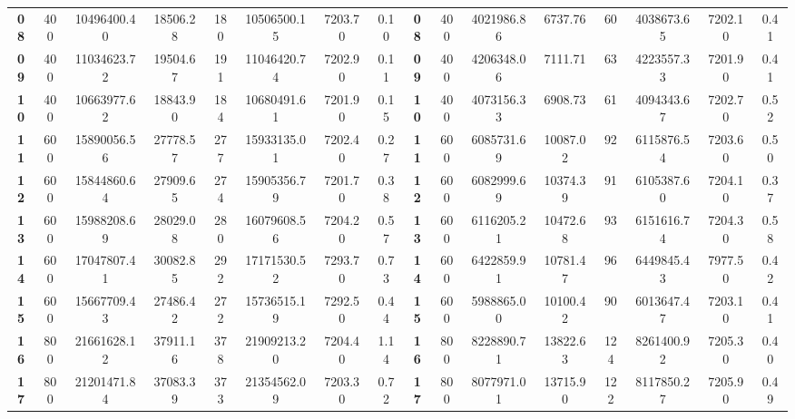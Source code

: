 \begin{table}[htbp]
{\begin{tabular}{cccccccccccccccc}
    \textbf{08}  & 400  & 10496400.40        & 18506.28  & 180               & 10506500.15       & 7203.70 & 0.10 & \textbf{08}  & 400  & 4021986.86         & 6737.76  & 60               & 4038673.65       & 7202.10 & 0.41  \\
    \textbf{09}  & 400  & 11034623.72        & 19504.67  & 191               & 11046420.74       & 7202.90 & 0.11 & \textbf{09}  & 400  & 4206348.06         & 7111.71  & 63               & 4223557.33       & 7201.90 & 0.41  \\
    \textbf{10}  & 400  & 10663977.62        & 18843.90  & 184               & 10680491.61       & 7201.90 & 0.15 & \textbf{10}  & 400  & 4073156.33         & 6908.73  & 61               & 4094343.67       & 7202.70 & 0.52  \\
    \textbf{11}  & 600  & 15890056.56        & 27778.57  & 277               & 15933135.01       & 7202.40 & 0.27 & \textbf{11}  & 600  & 6085731.69         & 10087.02  & 92               & 6115876.54       & 7203.60 & 0.50  \\
    \textbf{12}  & 600  & 15844860.64        & 27909.65  & 274               & 15905356.79       & 7201.70 & 0.38 & \textbf{12}  & 600  & 6082999.69         & 10374.39  & 91               & 6105387.60       & 7204.10 & 0.37  \\
    \textbf{13}  & 600  & 15988208.69        & 28029.08  & 280               & 16079608.56       & 7204.20 & 0.57 & \textbf{13}  & 600  & 6116205.21         & 10472.68  & 93               & 6151616.74       & 7204.30 & 0.58  \\
    \textbf{14}  & 600  & 17047807.41        & 30082.85  & 292               & 17171530.52       & 7293.70 & 0.73 & \textbf{14}  & 600  & 6422859.91         & 10781.47  & 96               & 6449845.43       & 7977.50 & 0.42  \\
    \textbf{15}  & 600  & 15667709.43        & 27486.42  & 272               & 15736515.19       & 7292.50 & 0.44 & \textbf{15}  & 600  & 5988865.00         & 10100.42  & 90               & 6013647.47       & 7203.10 & 0.41  \\
    \textbf{16}  & 800  & 21661628.12        & 37911.16  & 378               & 21909213.20       & 7204.40 & 1.14 & \textbf{16}  & 800  & 8228890.71         & 13822.63  & 124               & 8261400.92       & 7205.30 & 0.40  \\
    \textbf{17}  & 800  & 21201471.84        & 37083.39  & 373               & 21354562.09       & 7203.30 & 0.72 & \textbf{17}  & 800  & 8077971.01         & 13715.90  & 122               & 8117850.27       & 7205.90 & 0.49  \\

\end{tabular}}
\end{table}
